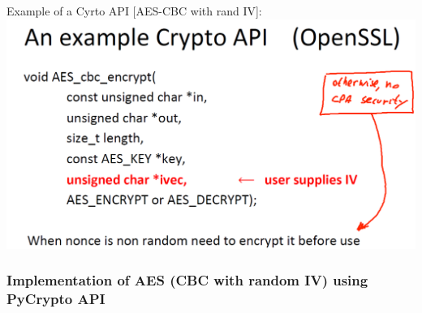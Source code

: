 \documentclass[11pt]{article}
\makeatletter
\def\maxwidth{\ifdim\Gin@nat@width>\linewidth\linewidth
    \else\Gin@nat@width\fi}
\let\Oldincludegraphics\includegraphics
\renewcommand{\includegraphics}[1]{\Oldincludegraphics[width=.8\maxwidth]{#1}}
\makeatother
\begin{document}
Example of a Cyrto API {[}AES-CBC with rand IV{]}:
\includegraphics{./Images/ExampleCryptoAPI.png}

\hypertarget{implementation-of-aes-cbc-with-random-iv-using-pycrypto-api}{%
\subsubsection{Implementation of AES (CBC with random IV) using PyCrypto
API}\label{implementation-of-aes-cbc-with-random-iv-using-pycrypto-api}}
\end{document}
